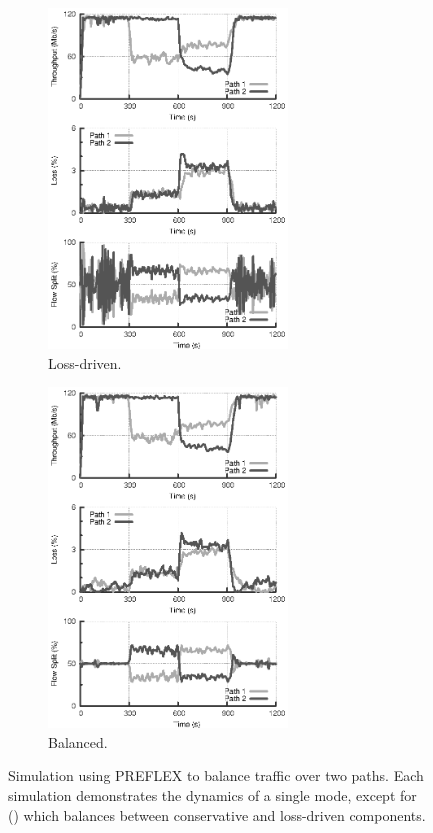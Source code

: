 \begin{figure}
    \begin{subfigure}[b]{.5\linewidth}
        \centering
        \includegraphics[width=2.5in]{figures/cate/two/loss}
        \caption{Loss-driven.}\label{fig:twoloss}
    \end{subfigure}%
    \begin{subfigure}[b]{.5\linewidth}
        \centering
        \includegraphics[width=2.5in]{figures/cate/two/correct}
        \caption{Balanced.}\label{fig:twopreflex}
    \end{subfigure}%

    \caption[Simulation using \acs{PREFLEX} to balance traffic over two paths.]
    {Simulation using \acs{PREFLEX} to balance traffic over two paths. \label{fig:two}
        Each simulation demonstrates the dynamics of a single mode, except for
        () which balances between conservative and loss-driven components.  }
\end{figure}

